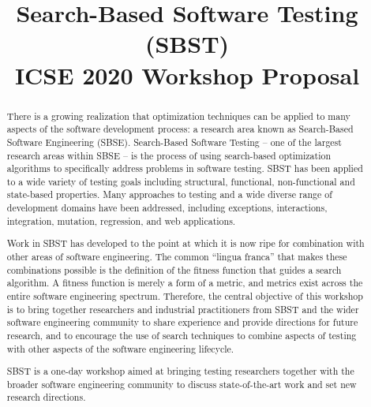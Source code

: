 \documentclass[10pt,conference]{IEEEtran}
\begin{document}
\title{Search-Based Software Testing (SBST) \\ ICSE 2020 Workshop Proposal}



\author{
\and
{}
}

\maketitle

\begin{abstract}
  There is a growing realization that optimization techniques can be
  applied to many aspects of the software development process: a
  research area known as Search-Based Software Engineering
  (SBSE). Search-Based Software Testing -- one of the largest research
  areas within SBSE -- is the process of using search-based
  optimization algorithms to specifically address problems in software
  testing. SBST has been applied to a wide variety of testing goals
  including structural, functional, non-functional and state-based
  properties. Many approaches to testing and a wide diverse range of
  development domains have been addressed, including exceptions,
  interactions, integration, mutation, regression, and web
  applications.

  Work in SBST has developed to the point at which it is now ripe for
  combination with other areas of software engineering. The common
  ``lingua franca'' that makes these combinations possible is the
  definition of the fitness function that guides a search algorithm. A
  fitness function is merely a form of a metric, and metrics exist
  across the entire software engineering spectrum. Therefore, the
  central objective of this workshop is to bring together researchers
  and industrial practitioners from SBST and the wider software
  engineering community to share experience and provide directions for
  future research, and to encourage the use of search techniques to
  combine aspects of testing with other aspects of the software
  engineering lifecycle.

  SBST is a one-day workshop aimed at bringing testing researchers
  together with the broader software engineering community to discuss
  state-of-the-art work and set new research directions.
\end{abstract}
\end{document}
